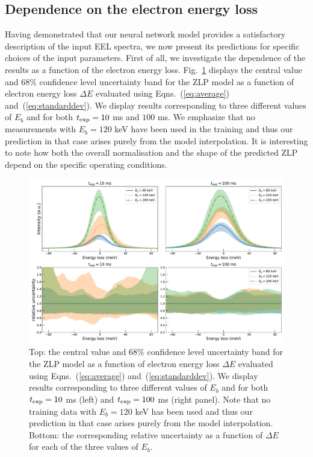 \subsection{Dependence on the electron energy loss}
\label{eq:depdeltae}

Having demonstrated that our neural network model provides a satisfactory description
of the input EEL spectra, we now present its  predictions for specific
choices of the input parameters.
%
First of all, we investigate the dependence of the results as a function of the
electron energy loss.
%
Fig.~\ref{fig:EELS_vacuum_DeltaE} displays the central value and 68\% confidence level uncertainty band
for the ZLP model as a function
of electron energy loss $\Delta E$
evaluated using Eqns.~(\ref{eq:average}) and~(\ref{eq:standarddev}).
%
We display results corresponding to 
three different values of $E_b$  and for both
$t_{\rm exp}=10$ ms and  $100$ ms.
%
We emphasize that no measurements with $E_b=120$ keV have been used in the training and thus our prediction
in that case arises purely from the model interpolation.
%
It is interesting to note how both the overall normalisation and the shape of
the predicted ZLP depend on the specific operating conditions.

\begin{figure}[t]
    \centering
    \includegraphics[width=170mm]{plots/deltaE_dependence_vacuum.pdf}
    \caption{\small Top: the central value and 68\% confidence level uncertainty band
      for the ZLP model as a function
      of electron energy loss $\Delta E$
      evaluated using Eqns.~(\ref{eq:average}) and~(\ref{eq:standarddev}).
      We display results corresponding to 
      three different values of $E_b$  and for both
      $t_{\rm exp}=10$ ms (left)  and $t_{\rm exp}=100$ ms (right panel).
      Note that no training data with $E_b=120$ keV has been used and thus our prediction
      in that case arises purely from the model interpolation.
      Bottom: the corresponding relative uncertainty as a function of $\Delta E$
      for each of the three values of $E_b$.
      \label{fig:EELS_vacuum_DeltaE}}
\end{figure}


